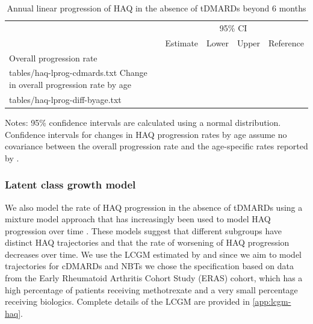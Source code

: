 \documentclass[11pt,final,fleqn]{article}
\makeatletter
\theoremstyle{plain}
\newcommand*\ExpandableInput[1]{\@@input#1 }
\makeatother
\begin{document}
\begin{table}[!ht]
\begin{center}
\begin{threeparttable}
\caption{Annual linear progression of HAQ in the absence of tDMARDs beyond 6 months} \label{tbl:haq-lprog}
\footnotesize
\begin{tabularx}{\textwidth}{@{\extracolsep{\fill}}lrrrl}
\hline
\multicolumn{2}{l}{} & \multicolumn{2}{c}{95\% CI} & \multicolumn{1}{l}{} \\
\cmidrule{3-4} 
\multicolumn{1}{l}{} & \multicolumn{1}{r}{Estimate} & \multicolumn{1}{r}{Lower} & \multicolumn{1}{r}{Upper} & \multicolumn{1}{l}{Reference} \\
\hline
Overall progression rate \\
\ExpandableInput{tables/haq-lprog-cdmards.txt}
Change in overall progression rate by age \\
\ExpandableInput{tables/haq-lprog-diff-byage.txt}
\hline
\end{tabularx}
\scriptsize
Notes: 95\% confidence intervals are calculated using a normal distribution. Confidence intervals for changes in HAQ progression rates by age assume no covariance between the overall progression rate and the age-specific rates reported by \citet{michaud2011treatment}.
\end{threeparttable}
\end{center}
\end{table}

\subsubsection{Latent class growth model} \label{sec:haq-lcgm}
We also model the rate of HAQ progression in the absence of tDMARDs using a mixture model approach that has increasingly been used to model HAQ progression over time \citep{stevenson2016adalimumab, norton2013trajectories, norton2014health}. These models suggest that different subgroups have distinct HAQ trajectories and that the rate of worsening of HAQ progression decreases over time. We use the LCGM estimated by \citet{norton2014health} and since we aim to model trajectories for cDMARDs and NBTs we chose the specification based on data from the Early Rheumatoid Arthritis Cohort Study (ERAS) cohort, which has a high percentage of patients receiving methotrexate and a very small percentage receiving biologics. Complete details of the LCGM are provided in \autoref{app:lcgm-haq}. 
\end{document}
